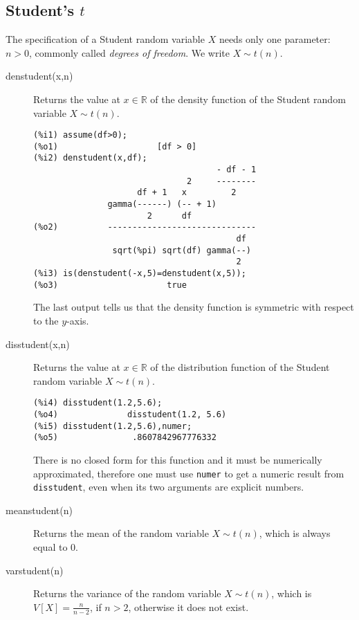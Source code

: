 \documentclass[12pt,a4paper]{article}
\newcommand{\R}{\mathbb{R}}
\begin{document}
\subsection{Student's $t$}

The specification of a Student random variable $X$ needs only one parameter: $n > 0$, commonly called \emph{degrees of freedom}. We write $X \sim t(n)$.

\begin{description}

\item[denstudent(x,n)] Returns the value at $x \in \R$ of the density function of the Student random variable $X \sim t(n)$.

\begin{verbatim}
(%i1) assume(df>0);
(%o1)                    [df > 0]
(%i2) denstudent(x,df);
                                     - df - 1
                               2     --------
                     df + 1   x         2
               gamma(------) (-- + 1)
                       2      df
(%o2)          ------------------------------
                                         df
                sqrt(%pi) sqrt(df) gamma(--)
                                         2
(%i3) is(denstudent(-x,5)=denstudent(x,5));
(%o3)                      true
\end{verbatim}
The last output tells us that the density function is symmetric with respect to the $y$-axis.

\item[disstudent(x,n)] Returns the value at $x \in \R$ of the distribution function of the Student random variable $X \sim t(n)$.

\begin{verbatim}
(%i4) disstudent(1.2,5.6);
(%o4)              disstudent(1.2, 5.6)
(%i5) disstudent(1.2,5.6),numer;
(%o5)               .8607842967776332
\end{verbatim}
There is no closed form for this function and it must be numerically approximated, therefore one must use \verb|numer| to get a numeric result from \verb|disstudent|, even when its two arguments are explicit numbers.

\item[meanstudent(n)] Returns the mean of the random variable $X \sim t(n)$, which is always equal to 0.

\item[varstudent(n)] Returns the variance of the random variable $X \sim t(n)$, which is $V[X]=\frac{n}{n-2}$, if $n>2$, otherwise it does not exist.


\end{description}
\end{document}
